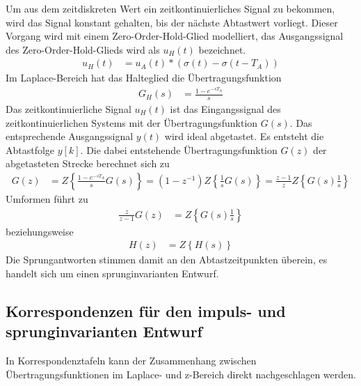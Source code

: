 Um aus dem zeitdiskreten Wert ein zeitkontinuierliches Signal zu bekommen, wird das Signal konstant gehalten, bis der nächste Abtastwert vorliegt. Dieser Vorgang wird mit einem Zero-Order-Hold-Glied modelliert, das Ausgangssignal des Zero-Order-Hold-Glieds wird als \(u_{H}(t)\) bezeichnet.
\begin{align}
u_{H}(t) &= u_{A}(t)*\left( \sigma(t) - \sigma\left( t - T_{A} \right) \right) \label{eq:9.22}
\end{align}
Im Laplace-Bereich hat das Halteglied die Übertragungsfunktion
\begin{align}
G_{H}(s) &= \frac{1 - e^{- s  T_{A}}}{s} \label{eq:9.23}
\end{align}
Das zeitkontinuierliche Signal \(u_{H}(t)\) ist das Eingangssignal des zeitkontinuierlichen Systems mit der Übertragungsfunktion \(G(s)\). Das entsprechende Ausgangssignal \(y(t)\) wird ideal abgetastet. Es entsteht die Abtastfolge \(y[k]\). Die dabei entstehende Übertragungsfunktion \(G(z)\) der abgetasteten Strecke berechnet sich zu
\begin{align}
G(z) &= Z\left\{ \frac{1 - e^{- s  T_{A}}}{s}  G(s) \right\} = \left( 1 - z^{- 1} \right)  Z\left\{ \frac{1}{s}  G(s) \right\} = \frac{z - 1}{z}  Z\left\{ G(s)  \frac{1}{s} \right\} \label{eq:9.24}
\end{align}
Umformen führt zu
\begin{align}
\frac{z}{z - 1}  G(z) &= Z\left\{ G(s)  \frac{1}{s} \right\} \label{eq:9.25}
\end{align}
beziehungsweise
\begin{align}
H(z) &= Z\left\{ H(s) \right\} \label{eq:9.26}
\end{align}
Die Sprungantworten stimmen damit an den Abtastzeitpunkten überein, es handelt sich um einen sprunginvarianten Entwurf.

\subsection{Korrespondenzen für den impuls- und sprunginvarianten Entwurf}\label{sec:korrespondenzen-fuxfcr-den-impuls--und-sprunginvarianten-entwurf}

In Korrespondenztafeln kann der Zusammenhang zwischen Übertragungsfunktionen im Laplace- und z-Bereich direkt nachgeschlagen werden.

